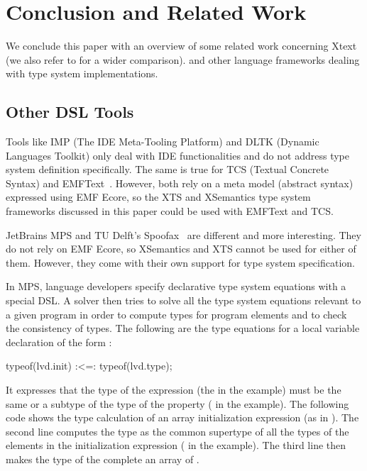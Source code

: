 
\section{Conclusion and Related Work}
\label{sec:conclusion}

We conclude this paper with an overview of some related work concerning Xtext
(we also refer to \cite{PP08} for a wider comparison).
and other language frameworks dealing with type system implementations.

\newcommand{\xtypes}{XTypeS}
\newcommand{\xtext}{Xtext}

\subsection{Other DSL Tools}


Tools like IMP (The IDE Meta-Tooling Platform) \cite{imp09} and DLTK (Dynamic
Languages Toolkit) \cite{DLTK} only deal with IDE functionalities and do not
address type system definition specifically. 
The same is true for TCS (Textual Concrete Syntax) \cite{tcs}  
and EMFText~\cite{emftext09}. However, both rely on a meta model (abstract
syntax) expressed using EMF Ecore, so the XTS and XSemantics type system
frameworks discussed in this paper could be used with EMFText and TCS. 

JetBrains MPS \cite{MPS} and TU Delft's Spoofax~\cite{Spoofax2010} are different
and more interesting. They do not rely on EMF Ecore, so XSemantics and XTS
cannot be used for either of them. However, they come with their own support
for type system specification. 

In MPS, language developers specify declarative type system equations with a
special DSL. A solver then tries to solve all the type system equations relevant
to a given program in order to compute types for program elements and to check
the consistency of types. The following are the type equations for a local
variable declaration of the form :

\begin{code} 
typeof(lvd.init) :<=: typeof(lvd.type);
\end{code}

It expresses that the type of the  expression (the  in the
example) must be the same or a subtype of the type of the  property
( in the example). The following code shows the type calculation of an
array initialization expression (as in ). The second line
computes the type  as the common supertype of all the types of the
elements in the initialization expression ( in the example). The third
line then makes the type of the complete  an array of .

